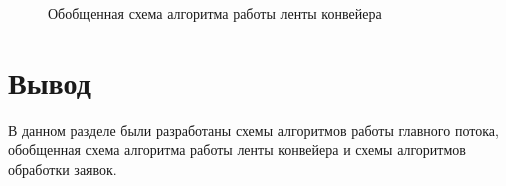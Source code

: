 \begin{figure}
	\caption{Обобщенная схема алгоритма работы ленты конвейера}
	\label{ZBufferWithThreads}
\end{figure}

\newpage
\section{Вывод}
В данном разделе были разработаны схемы алгоритмов работы главного потока, обобщенная схема алгоритма работы ленты конвейера и схемы алгоритмов обработки заявок.